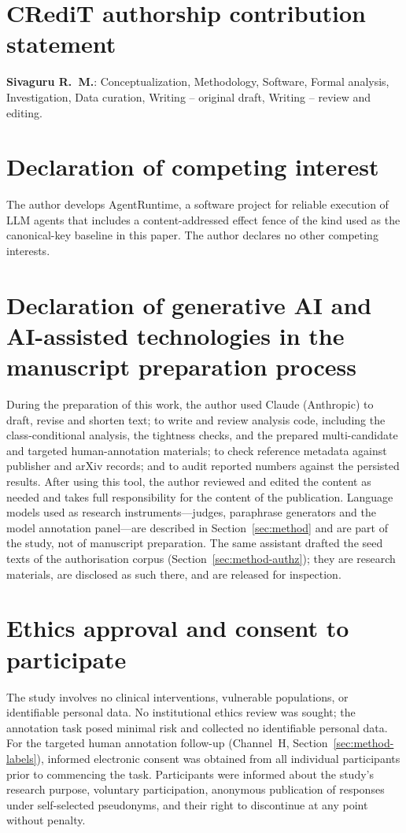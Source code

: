 \section*{CRediT authorship contribution statement}
\textbf{Sivaguru R.~M.}: Conceptualization, Methodology, Software, Formal analysis, Investigation, Data curation, Writing -- original draft, Writing -- review and editing.

\section*{Declaration of competing interest}
The author develops AgentRuntime, a software project for reliable execution of LLM agents that includes a content-addressed effect fence of the kind used as the canonical-key baseline in this paper. The author declares no other competing interests.

\section*{Declaration of generative AI and AI-assisted technologies in the manuscript preparation process}
During the preparation of this work, the author used Claude (Anthropic) to draft, revise and shorten text; to write and review analysis code, including the class-conditional analysis, the tightness checks, and the prepared multi-candidate and targeted human-annotation materials; to check reference metadata against publisher and arXiv records; and to audit reported numbers against the persisted results. After using this tool, the author reviewed and edited the content as needed and takes full responsibility for the content of the publication. Language models used as research instruments---judges, paraphrase generators and the model annotation panel---are described in Section~\ref{sec:method} and are part of the study, not of manuscript preparation. The same assistant drafted the seed texts of the authorisation corpus (Section~\ref{sec:method-authz}); they are research materials, are disclosed as such there, and are released for inspection.

\section*{Ethics approval and consent to participate}
The study involves no clinical interventions, vulnerable populations, or identifiable personal data. No institutional ethics review was sought; the annotation task posed minimal risk and collected no identifiable personal data. For the targeted human annotation follow-up (Channel~H, Section~\ref{sec:method-labels}), informed electronic consent was obtained from all individual participants prior to commencing the task. Participants were informed about the study's research purpose, voluntary participation, anonymous publication of responses under self-selected pseudonyms, and their right to discontinue at any point without penalty.

